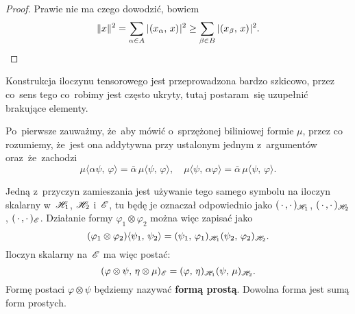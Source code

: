 \documentclass[a4paper,11pt]{article}
\numberwithin{equation}{section}
\begin{document}
\begin{proof}

  Prawie nie ma czego dowodzić, bowiem
  \begin{equation*}
    \label{eq:RS-Vol-I-s01-27}
    \lVert{  x  }\rVert^{ 2 } = \sum_{ \alpha \in A } | \hspace{0.05em}  ( x_{ \alpha }, \, x )  \hspace{0.05em} |^{ 2 }
    \geq \sum_{ \beta \in B } | \hspace{0.05em}  ( x_{ \beta }, \, x )  \hspace{0.05em} |^{ 2 }.
  \end{equation*}

\end{proof}

\VerSpaceFour



 Konstrukcja iloczynu tensorowego jest przeprowadzona
bardzo szkicowo, przez co~sens tego co~robimy jest często ukryty,
tutaj postaram~się uzupełnić brakujące elementy.

Po~pierwsze zauważmy, że~aby mówić o~sprzężonej biliniowej formie
$\mu$, przez co rozumiemy, że~jest ona addytywna przy ustalonym
jednym z~argumentów oraz~że~zachodzi
\begin{equation}
  \label{eq:RS-Vol-I-s01-28}
  \mu\langle \alpha \psi, \, \varphi \rangle = \bar{ \alpha } \, \mu\langle \psi, \, \varphi \rangle, \quad
  \mu\langle \psi, \, \alpha \varphi \rangle =
  \bar{ \alpha } \, \mu\langle \psi, \, \varphi \rangle.
\end{equation}

Jedną z~przyczyn zamieszania jest używanie tego samego symbolu na
iloczyn skalarny w~$\mathcal{H}_{ 1 }$, $\mathcal{H}_{ 2 }$ i~$\mathcal{E}$, tu będę je
oznaczał odpowiednio jako $( \, \cdot \,, \cdot \, )_{ \mathcal{H}_{ 1 } }$,
$( \, \cdot \,, \cdot \, )_{ \mathcal{H}_{ 2 } }$, $( \, \cdot \,, \cdot \, )_{ \mathcal{E} }$.
Działanie formy $\varphi_{ 1 } \otimes \varphi_{ 2 }$ można więc zapisać jako
\begin{equation}
  \label{eq:RS-Vol-I-s01-29}
  ( \varphi_{ 1 } \otimes \varphi_{ 2 } ) \langle \psi_{ 1 }, \, \psi_{ 2 } \rangle
  =
  ( \psi_{ 1 }, \, \varphi_{ 1 } )_{ \mathcal{H}_{ 1 } }
  ( \psi_{ 2 }, \, \varphi_{ 2 } )_{ \mathcal{H}_{ 2 } }.
\end{equation}
Iloczyn skalarny na~$\mathcal{E}$ ma więc postać:
\begin{equation}
  \label{eq:RS-Vol-I-s01-30}
  ( \varphi \otimes  \psi, \, \eta \otimes \mu )_{ \mathcal{E} }
  = ( \varphi, \, \eta )_{ \mathcal{H}_{ 1 } } ( \psi, \,  \mu )_{ \mathcal{H}_{ 2 } }.
\end{equation}
Formę postaci $\varphi \otimes \psi$ będziemy nazywać \textbf{formą prostą}.
Dowolna forma jest sumą form prostych.
\end{document}
